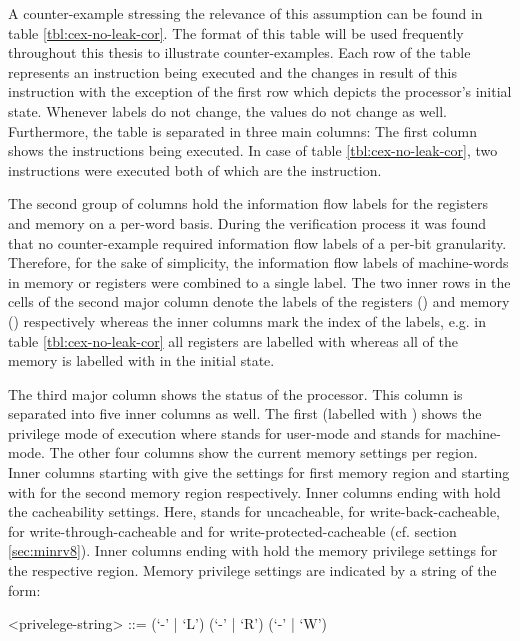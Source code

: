 A counter-example stressing the relevance of this assumption can be found in table \ref{tbl:cex-no-leak-cor}.
The format of this table will be used frequently throughout this thesis to illustrate counter-examples.
Each row of the table represents an instruction being executed and the changes in result of this instruction with the exception of the first row which depicts the processor's initial state.
Whenever labels do not change, the values do not change as well.
Furthermore, the table is separated in three main columns: The first column shows the instructions being executed.
In case of table \ref{tbl:cex-no-leak-cor}, two instructions were executed both of which are the  instruction.

The second group of columns hold the information flow labels for the registers and memory on a per-word basis.
During the verification process it was found that no counter-example required information flow labels of a per-bit granularity.
Therefore, for the sake of simplicity, the information flow labels of machine-words in memory or registers were combined to a single label.
The two inner rows in the cells of the second major column denote the labels of the registers () and memory () respectively whereas the inner columns mark the index of the labels, e.g. in table \ref{tbl:cex-no-leak-cor} all registers are labelled with \CT{} whereas all of the memory is labelled with \CU{} in the initial state.

The third major column shows the status of the processor.
This column is separated into five inner columns as well.
The first (labelled with ) shows the privilege mode of execution where  stands for user-mode and  stands for machine-mode.
The other four columns show the current memory settings per region.
Inner columns starting with  give the settings for first memory region and starting with  for the second memory region respectively.
Inner columns ending with  hold the cacheability settings.
Here,  stands for uncacheable,  for write-back-cacheable,  for write-through-cacheable and  for write-protected-cacheable (cf. section \ref{sec:minrv8}).
Inner columns ending with  hold the memory privilege settings for the respective region.
Memory privilege settings are indicated by a string of the form:
\begin{grammar}
    <privelege-string> ::= (`-' | `L') (`-' | `R') (`-' | `W')
\end{grammar}

